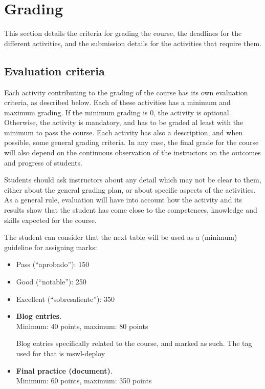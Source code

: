 \documentclass[a4paper]{article}
\begin{document}
\section{Grading}

This section details the criteria for grading the course, the
deadlines for the different activities, and the submission details for
the activities that require them.

\subsection{Evaluation criteria}
\label{sub:evaluation-criteria}

Each activity contributing to the grading of the course has its own
evaluation criteria, as described below. Each of these activities has
a minimum and maximum grading. If the minimum grading is 0, the
activity is optional. Otherwise, the activity is mandatory, and has to
be graded al least with the minimum to pass the course. Each activity
has also a description, and when possible, some general grading
criteria. In any case, the final grade for the course will also depend
on the continuous observation of the instructors on the outcomes and
progress of students.

Students should ask instructors about any detail which may not be
clear to them, either about the general grading plan, or about
specific aspects of the activities. As a general rule, evaluation will
have into account how the activity and its results show that the
student has come close to the competences, knowledge and skills
expected for the course.

The student can consider that the next table will be used as a
(minimum) guideline for assigning marks:

\begin{itemize}
\item Pass (``aprobado''): 150
\item Good (``notable''): 250
\item Excellent (``sobresaliente''): 350
\end{itemize}

\begin{itemize}
\item \textbf{Blog entries}. \\
  Minimum: 40 points, maximum: 80 points

  Blog entries specifically related to the course, and marked as such. The tag used for that is mswl-deploy


\item \textbf{Final practice (document)}. \\
  Minimum: 60 points, maximum: 350 points



\end{itemize}
\end{document}
